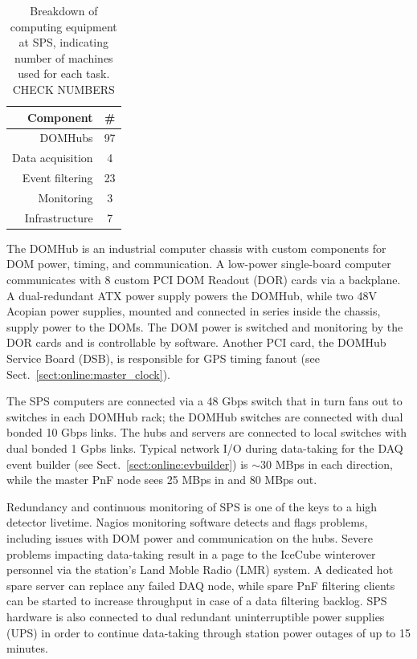 \begin{table}[h]
  \centering
  \begin{tabular}{ r | c }
    \bf{Component} & \bf{\#} \\
    \hline
    DOMHubs & 97 \\
    Data acquisition & 4 \\   
    Event filtering & 23 \\
    Monitoring & 3 \\
    Infrastructure & 7 \\
  \end{tabular}
  \caption{Breakdown of computing equipment at SPS, indicating number of
    machines used for each task. CHECK NUMBERS} 
  \label{tab:sps_breakdown}
\end{table}

The DOMHub is an industrial computer chassis with custom components for
DOM power, timing, and communication.  A low-power single-board computer
communicates with 8 custom PCI DOM Readout (DOR) cards via a backplane.  A
dual-redundant ATX power supply powers the DOMHub, while two 48V Acopian
power supplies, mounted and connected in series inside the chassis, supply
power to the DOMs.  The DOM power is switched and monitoring by the DOR
cards and is controllable by software.  Another PCI card, the DOMHub
Service Board (DSB), is responsible for GPS timing fanout (see
Sect.~\ref{sect:online:master_clock}).


The SPS computers are connected via a 48 Gbps switch that in turn fans out
to switches in each DOMHub rack; the DOMHub switches are connected with
dual bonded 10 Gbps links.  The hubs and servers are connected to local
switches with dual bonded 1 Gpbs links.  Typical network I/O during data-taking for the
DAQ event builder (see Sect.~\ref{sect:online:evbuilder}) is $\sim30$ MBps in each
direction, while the master PnF node sees 25 MBps in and 80 MBps out.

Redundancy and continuous monitoring of SPS is one of the keys to a high
detector livetime.  Nagios monitoring software detects and flags problems,
including issues with DOM power and communication on the hubs.  Severe
problems impacting data-taking result in a page to the IceCube
winterover personnel via the station's Land Moble Radio (LMR) system. 
A dedicated hot spare server can replace any failed DAQ
node, while spare PnF filtering clients can be started to increase
throughput in case of a data filtering backlog.  SPS hardware is also
connected to dual redundant uninterruptible power supplies 
(UPS) in order to continue data-taking through station power outages of up
to 15 minutes.  

